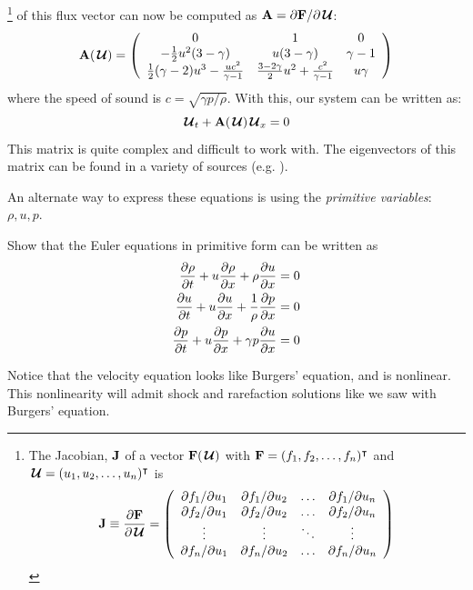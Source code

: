 \footnote{
The Jacobian, ${\bf J}$ of a vector ${\bf F}({\,\boldsymbol{\mathcal{U}}})$ with ${\bf F} = (f_1, f_2, \ldots, f_n)^\intercal$ and
${\,\boldsymbol{\mathcal{U}}} = (u_1, u_2, \ldots, u_n)^\intercal$ is 
\begin{equation*}
{\bf J} \equiv \frac{\partial {\bf F}}{\partial {\,\boldsymbol{\mathcal{U}}}} = \left (
  \begin{array}{cccc}
     \partial f_1/\partial u_1 & \partial f_1/\partial u_2 & \ldots & \partial f_1/\partial u_n \\
     \partial f_2/\partial u_1 & \partial f_2/\partial u_2 & \ldots & \partial f_2/\partial u_n \\
     \vdots                    & \vdots                    & \ddots & \vdots \\
     \partial f_n/\partial u_1 & \partial f_n/\partial u_2 & \ldots & \partial f_n/\partial u_n 
  \end{array} \right )
\end{equation*}
}
of this flux vector can now be computed as ${\bf A} = \partial
{\bf F}/\partial {\,\boldsymbol{\mathcal{U}}}$:
\begin{equation}
{\bf A}({\,\boldsymbol{\mathcal{U}}}) = \left ( \begin{array}{ccc}
   0  & 1 & 0 \\
   -\frac{1}{2}u^2(3 -\gamma) & u (3 -\gamma) & \gamma - 1 \\
   \frac{1}{2}(\gamma -2)u^3 - \frac{uc^2}{\gamma -1} &
       \frac{3-2\gamma}{2} u^2 + \frac{c^2}{\gamma -1} & u \gamma
  \end{array} \right )
\end{equation}
where the speed of sound is $c = \sqrt{\gamma p/\rho}$.   With this, our
system can be written as:
\begin{equation}
{\,\boldsymbol{\mathcal{U}}}_t + {\bf A}({\,\boldsymbol{\mathcal{U}}}) {\,\boldsymbol{\mathcal{U}}}_x = 0
\end{equation}
This matrix is quite complex and difficult to work with.  The
eigenvectors of this matrix can be found in a variety of sources
(e.g. \cite{toro:1997,athena}).


An alternate way to express these equations is using the {\em
  primitive variables}: $\rho, u, p$.
\begin{exercise}
{Show that the Euler equations in primitive form can
  be written as
\begin{align}
{\frac{{\partial\rho}}{\partial t}} + u {\frac{{\partial\rho}}{\partial x}} + \rho {\frac{{\partial u}}{\partial x}} &= 0 \\
{\frac{{\partial u}}{\partial t}} + u {\frac{{\partial u}}{\partial x}} + \frac{1}{\rho} {\frac{{\partial p}}{\partial x}} &= 0 \\
{\frac{{\partial p}}{\partial t}} + u {\frac{{\partial p}}{\partial x}} + \gamma p {\frac{{\partial u}}{\partial x}} &= 0
\end{align}
}
\end{exercise}
Notice that the velocity equation looks like Burgers' equation, and 
is nonlinear.  This nonlinearity will admit shock and rarefaction
solutions like we saw with Burgers' equation.

